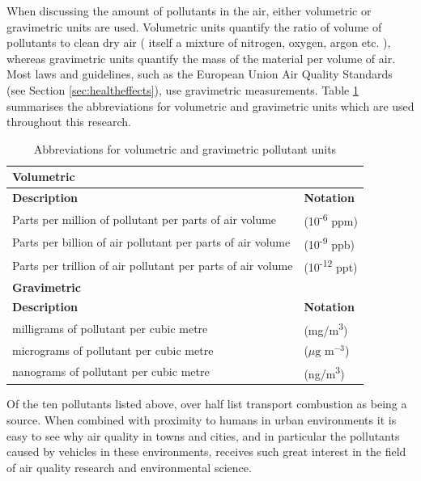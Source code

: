 When discussing the amount of pollutants in the air, either volumetric or gravimetric units are used. Volumetric units quantify the ratio of volume of pollutants to clean dry air ( itself a mixture of nitrogen, oxygen, argon etc. ), whereas gravimetric units  quantify the mass of the material per volume of air. Most laws and guidelines, such as the European Union Air Quality Standards (see Section \ref{sec:healtheffects}), use gravimetric measurements. Table \ref{tab:pollution_units} summarises the abbreviations for volumetric and gravimetric units which are used throughout this research.

\begin{table}[H]
\caption{Abbreviations for volumetric and gravimetric pollutant units}
\centering
    \begin{tabular}{ | l | l |}
    \hline 
     \textbf{Volumetric} & \\ \hline
     \textbf{Description} & \textbf{Notation} \\ \hline
      Parts per million of pollutant per parts of air volume & (10\textsuperscript{-6} ppm) \\ \hline
     Parts per billion of air pollutant per parts of air volume & (10\textsuperscript{-9} ppb) \\ \hline
     Parts per trillion of air pollutant per parts of air volume & (10\textsuperscript{-12} ppt) \\ \hline
     \textbf{Gravimetric} & \\ \hline
     \textbf{Description} & \textbf{Notation} \\ \hline
     milligrams of pollutant per cubic metre & (mg/m\textsuperscript{3}) \\ \hline
     micrograms of pollutant per cubic metre & ($\mu \text{g m}^{-3}$) \\ \hline
     nanograms of pollutant per cubic metre & (ng/m\textsuperscript{3}) \\ \hline
    \end{tabular}
\label{tab:pollution_units}
\end{table}
 
Of the ten pollutants listed above, over half list transport combustion as being a source. When combined with proximity to humans in urban environments it is easy to see why air quality in towns and cities, and in particular the pollutants caused by vehicles in these environments, receives such great interest in the field of air quality research and environmental science.

